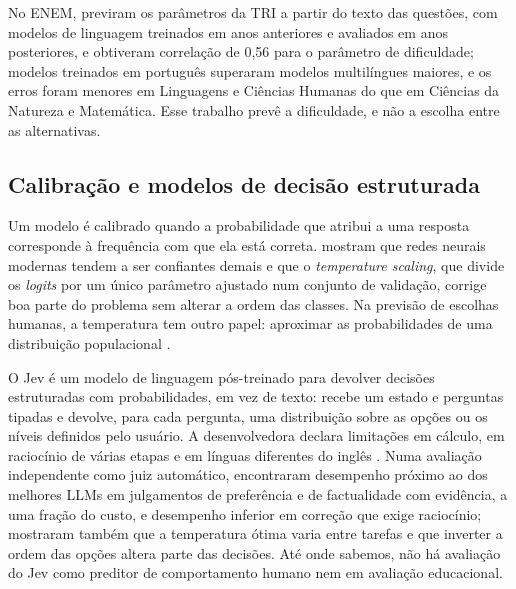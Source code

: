 No ENEM, \citet{marinho2023} previram os parâmetros da TRI a partir do texto das questões, com modelos de linguagem treinados em anos anteriores e avaliados em anos posteriores, e obtiveram correlação de 0,56 para o parâmetro de dificuldade; modelos treinados em português superaram modelos multilíngues maiores, e os erros foram menores em Linguagens e Ciências Humanas do que em Ciências da Natureza e Matemática. Esse trabalho prevê a dificuldade, e não a escolha entre as alternativas.

\subsection{Calibração e modelos de decisão estruturada}\label{sec:ref-calibracao}

Um modelo é calibrado quando a probabilidade que atribui a uma resposta corresponde à frequência com que ela está correta. \citet{guo2017} mostram que redes neurais modernas tendem a ser confiantes demais e que o \textit{temperature scaling}, que divide os \textit{logits} por um único parâmetro ajustado num conjunto de validação, corrige boa parte do problema sem alterar a ordem das classes. Na previsão de escolhas humanas, a temperatura tem outro papel: aproximar as probabilidades de uma distribuição populacional \citep{liusie2023,saeuberli2025}.

O Jev \citep{typesafe2026docs} é um modelo de linguagem pós-treinado para devolver decisões estruturadas com probabilidades, em vez de texto: recebe um estado e perguntas tipadas e devolve, para cada pergunta, uma distribuição sobre as opções ou os níveis definidos pelo usuário. A desenvolvedora declara limitações em cálculo, em raciocínio de várias etapas e em línguas diferentes do inglês \citep{typesafe2026jaggedness}. Numa avaliação independente como juiz automático, \citet{li2026} encontraram desempenho próximo ao dos melhores LLMs em julgamentos de preferência e de factualidade com evidência, a uma fração do custo, e desempenho inferior em correção que exige raciocínio; mostraram também que a temperatura ótima varia entre tarefas e que inverter a ordem das opções altera parte das decisões. Até onde sabemos, não há avaliação do Jev como preditor de comportamento humano nem em avaliação educacional.

